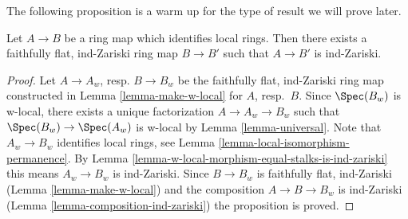 \noindent
The following proposition is a warm up for the type of result
we will prove later.

\begin{proposition}
\label{proposition-maps-wich-identify-local-rings}
Let $A \to B$ be a ring map which identifies local rings.
Then there exists a faithfully flat, ind-Zariski ring map
$B \to B'$ such that $A \to B'$ is ind-Zariski.
\end{proposition}

\begin{proof}
Let $A \to A_w$, resp. $B \to B_w$ be the faithfully flat, ind-Zariski ring
map constructed in Lemma \ref{lemma-make-w-local} for $A$, resp.\ $B$.
Since $\Spec(B_w)$ is w-local, there exists a unique factorization
$A \to A_w \to B_w$ such that $\Spec(B_w) \to \Spec(A_w)$ is w-local
by Lemma \ref{lemma-universal}. Note that $A_w \to B_w$ identifies
local rings, see
Lemma \ref{lemma-local-isomorphism-permanence}.
By Lemma \ref{lemma-w-local-morphism-equal-stalks-is-ind-zariski}
this means $A_w \to B_w$ is ind-Zariski. Since $B \to B_w$ is
faithfully flat, ind-Zariski (Lemma \ref{lemma-make-w-local})
and the composition $A \to B \to B_w$ is ind-Zariski
(Lemma \ref{lemma-composition-ind-zariski})
the proposition is proved.
\end{proof}
